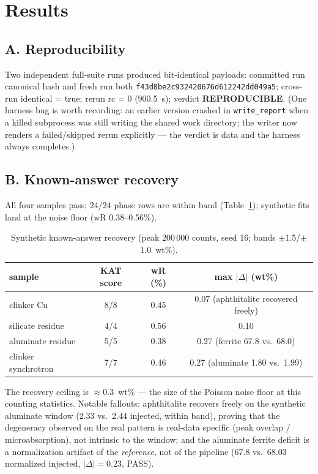 \documentclass[11pt,a4paper]{article}
\begin{document}
\section{Results}
\subsection{A. Reproducibility}
Two independent full-suite runs produced bit-identical payloads:
committed run canonical hash and fresh run both
\texttt{f43d8be2c932420676d612242dd049a5};
cross-run identical = true; rerun rc = 0 (900.5~s); verdict
\textbf{REPRODUCIBLE}. (One harness bug is worth recording: an earlier
version crashed in \texttt{write\_report} when a killed subprocess was
still writing the shared work directory; the writer now renders a
failed/skipped rerun explicitly --- the verdict is data and the harness
always completes.)

\subsection{B. Known-answer recovery}
All four samples pass; $24/24$ phase rows are within band
(Table~\ref{tab:kat}); synthetic fits land at the noise floor
(wR 0.38--0.56\%).
\begin{table}[ht]
\centering
\small
\begin{tabular}{@{}lccc@{}}
\toprule
sample & KAT score & wR (\%) & max $|\Delta|$ (wt\%) \\
\midrule
clinker Cu & 8/8 & 0.45 & 0.07 (aphthitalite recovered freely) \\
silicate residue & 4/4 & 0.56 & 0.10 \\
aluminate residue & 5/5 & 0.38 & 0.27 (ferrite 67.8 vs.\ 68.0) \\
clinker synchrotron & 7/7 & 0.46 & 0.27 (aluminate 1.80 vs.\ 1.99) \\
\bottomrule
\end{tabular}
\caption{Synthetic known-answer recovery (peak 200\,000 counts,
seed 16; bands $\pm$1.5/$\pm$1.0~wt\%).}
\label{tab:kat}
\end{table}
The recovery ceiling is $\approx$0.3~wt\% --- the size of the Poisson
noise floor at this counting statistics. Notable fallouts: aphthitalite
recovers freely on the synthetic aluminate window (2.33 vs.\ 2.44
injected, within band), proving that the degeneracy observed on the real
pattern is real-data specific (peak overlap / microabsorption), not
intrinsic to the window; and the aluminate ferrite deficit is a
normalization artifact of the \emph{reference}, not of the pipeline
(67.8 vs.\ 68.03 normalized injected, $|\Delta| = 0.23$, PASS).
\end{document}
